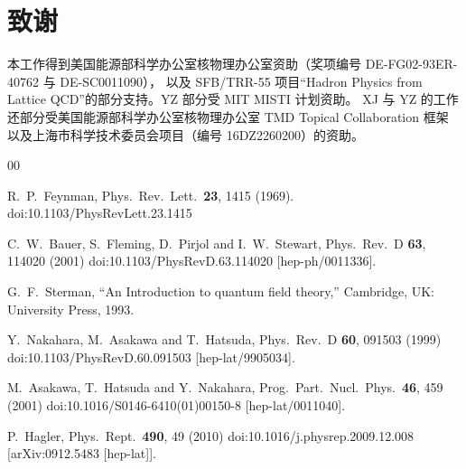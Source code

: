 \section*{致谢}
本工作得到美国能源部科学办公室核物理办公室资助（奖项编号 DE-FG02-93ER-40762 与 DE-SC0011090），
以及 SFB/TRR-55 项目``Hadron Physics from Lattice QCD''的部分支持。YZ 部分受 MIT MISTI 计划资助。
XJ 与 YZ 的工作还部分受美国能源部科学办公室核物理办公室 TMD Topical Collaboration 框架
以及上海市科学技术委员会项目（编号 16DZ2260200）的资助。

\begin{thebibliography}{00}

	R.~P.~Feynman,
	Phys.\ Rev.\ Lett.\  {\bf 23}, 1415 (1969).
	doi:10.1103/PhysRevLett.23.1415


	C.~W.~Bauer, S.~Fleming, D.~Pirjol and I.~W.~Stewart,
	Phys.\ Rev.\ D {\bf 63}, 114020 (2001)
	doi:10.1103/PhysRevD.63.114020
	[hep-ph/0011336].


	G.~F.~Sterman,
	``An Introduction to quantum field theory,''
	Cambridge, UK: University Press, 1993.


	Y.~Nakahara, M.~Asakawa and T.~Hatsuda,
	Phys.\ Rev.\ D {\bf 60}, 091503 (1999)
	doi:10.1103/PhysRevD.60.091503
	[hep-lat/9905034].


	M.~Asakawa, T.~Hatsuda and Y.~Nakahara,
	Prog.\ Part.\ Nucl.\ Phys.\  {\bf 46}, 459 (2001)
	doi:10.1016/S0146-6410(01)00150-8
	[hep-lat/0011040].


	P.~Hagler,
	Phys.\ Rept.\  {\bf 490}, 49 (2010)
	doi:10.1016/j.physrep.2009.12.008
	[arXiv:0912.5483 [hep-lat]].



\end{thebibliography}
